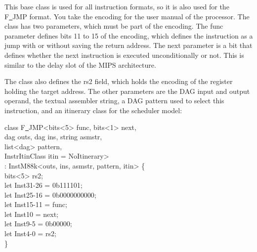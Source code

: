 This base class is used for all instruction formats, so it is also used for the F\underline{~}JMP format. You take the encoding for the user manual of the processor. The class has two parameters, which must be part of the encoding. The func parameter defines bits 11 to 15 of the encoding, which defines the instruction as a jump with or without saving the return address. The next parameter is a bit that defines whether the next instruction is executed unconditionally or not. This is similar to the delay slot of the MIPS architecture.\par

The class also defines the rs2 field, which holds the encoding of the register holding the target address. The other parameters are the DAG input and output operand, the textual assembler string, a DAG pattern used to select this instruction, and an itinerary class for the scheduler model:\par

\begin{tcolorbox}[colback=white,colframe=black]
class F\underline{~}JMP<bits<5> func, bits<1> next, \\
\hspace*{3cm}dag outs, dag ins, string asmstr, \\
\hspace*{3cm}list<dag> pattern, \\
\hspace*{3cm}InstrItinClass itin = NoItinerary> \\
\hspace*{1.3cm}: InstM88k<outs, ins, asmstr, pattern, itin> \{ \\
\hspace*{1cm}bits<5> rs2; \\
\hspace*{1cm}let Inst{31-26} = 0b111101; \\
\hspace*{1cm}let Inst{25-16} = 0b0000000000; \\
\hspace*{1cm}let Inst{15-11} = func; \\
\hspace*{1cm}let Inst{10} = next; \\
\hspace*{1cm}let Inst{9-5} = 0b00000; \\
\hspace*{1cm}let Inst{4-0} = rs2; \\
\}
\end{tcolorbox}

